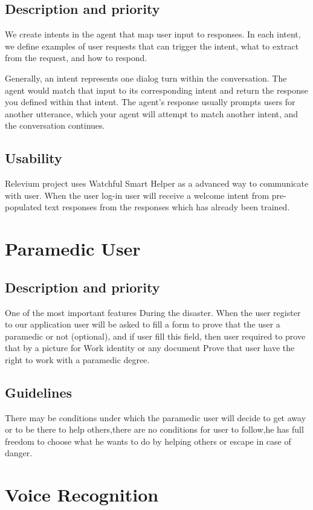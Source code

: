 \documentclass{scrreprt}
\begin{document}
\subsection{Description and priority}
We create intents in the agent that map user input to responses. In each intent, we define examples of user requests that can trigger the intent, what to extract from the request, and how to respond.

Generally, an intent represents one dialog turn within the conversation. The agent would match that input to its corresponding intent and return the response you defined within that intent. The agent’s response usually prompts users for another utterance, which your agent will attempt to match another intent, and the conversation continues.
\subsection{Usability}
Relevium project uses Watchful Smart Helper as a advanced way to communicate with user. When the user log-in user will receive a welcome intent from pre-populated text responses from the responses which has already been trained.

\section{Paramedic User}
\subsection{Description and priority}
One of the most important features During the disaster. When the user register to our application user will be asked to fill a form to prove that the user a paramedic or not (optional), and if user fill this field, then user required to prove that by a picture for Work identity or any document Prove that user have the right to work with a paramedic degree.

\subsection{Guidelines}
There may be conditions under which the paramedic user will decide to get away or to be there to help others,there are no conditions for user to follow,he has full freedom to choose what he wants to do by helping others or escape in case of danger.


\newpage
\section{Voice Recognition}
\end{document}
